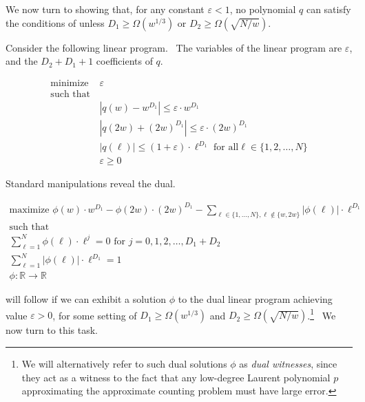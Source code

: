 \documentclass[10pt,a4paper]{article}
\newcommand{\<}{\langle}
\renewcommand{\>}{\rangle}
\newcommand{\Reals}{\mathbb R}
\newcommand{\eps}{\varepsilon}
\begin{document}
We now turn to showing that, for any constant $\varepsilon < 1$, no
polynomial $q$ can satisfy the conditions of  unless $D_1 \geq
\Omega(w^{1/3})$ or $D_2 \geq \Omega\left(\sqrt{N/w}\right)$.

Consider the following linear program. \ The variables of the linear program
are $\varepsilon $, and the $D_{2}+D_{1}+1$ coefficients of $q$.

\begin{equation}
\boxed{\begin{array}{ll} \text{minimize } & \eps \\ \mbox{such that} & \\
&|q(w) - w^{D_1}| \leq \eps \cdot w^{D_1}\\ &|q(2w) + (2w)^{D_1}| \leq \eps
\cdot (2w)^{D_1}\\ & |q(\ell)| \leq (1+\eps) \cdot \ell^{D_1} \text{ for all
} \ell \in \{1, 2, \dots, N\}\\ &\eps \geq 0 \end{array}}
\end{equation}

Standard manipulations reveal the dual.

\begin{equation} \label{duallp}
\boxed{\begin{array}{ll} \text{maximize } \phi(w) \cdot w^{D_1} - \phi(2w)
\cdot (2w)^{D_1} - \sum_{\ell \in \{1, \dots, N\}, \ell \not\in \{w, 2w\}}
|\phi(\ell)| \cdot \ell^{D_1} \\ \mbox{such that} & \\ \sum_{\ell=1}^{N}
\phi(\ell) \cdot \ell^j =0 \text{ for } j= 0, 1, 2, \dots, D_1 + D_2 &\\
\sum_{\ell=1}^N |\phi(\ell)| \cdot \ell^{D_1} = 1\\ \phi \colon \Reals \to
\mathbb{R} \end{array}}
\end{equation}

\label{s:duallp}

\medskip\medskip

 will follow if we can exhibit a solution $\phi $ to the dual
linear program achieving value $\varepsilon >0$, for some
setting of $D_{1}\geq \Omega (w^{1/3})$ and $D_{2}\geq \Omega \left( \sqrt{
N/w}\right) $.\footnote{
We will alternatively refer to such dual solutions $\phi $ as \emph{dual
witnesses}, since they act as a witness to the fact that any low-degree
Laurent polynomial $p$ approximating the approximate counting problem must
have large error.} \ We now turn to this task.
\end{document}
